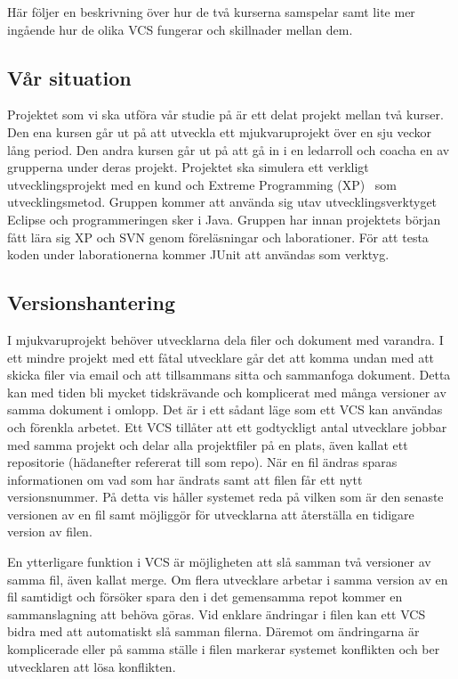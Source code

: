 Här följer en beskrivning över hur de två kurserna samspelar samt lite mer ingående hur de olika VCS fungerar och skillnader mellan dem.
\subsection{Vår situation}

Projektet som vi ska utföra vår studie på är ett delat projekt mellan två kurser. Den ena kursen går ut på att utveckla ett mjukvaruprojekt över en sju veckor lång period. Den andra kursen går ut på att gå in i en ledarroll och coacha en av grupperna under deras projekt. Projektet ska simulera ett verkligt utvecklingsprojekt med en kund och Extreme Programming (XP)~\cite{BeckXP} som utvecklingsmetod. Gruppen kommer att använda sig utav utvecklingsverktyget Eclipse och programmeringen sker i Java. Gruppen har innan projektets början fått lära sig XP och SVN genom föreläsningar och laborationer. För att testa koden under laborationerna kommer JUnit att användas som verktyg.


\subsection{Versionshantering}

I mjukvaruprojekt behöver utvecklarna dela filer och dokument med varandra. I ett mindre projekt med ett fåtal utvecklare går det att komma undan med att skicka filer via email och att tillsammans sitta och sammanfoga dokument. Detta kan med tiden bli mycket tidskrävande och komplicerat med många versioner av samma dokument i omlopp. Det är i ett sådant läge som ett VCS kan användas och förenkla arbetet. Ett VCS tillåter att ett godtyckligt antal utvecklare jobbar med samma projekt och delar alla projektfiler på en plats, även kallat ett repositorie (hädanefter refererat till som repo). När en fil ändras sparas informationen om vad som har ändrats samt att filen får ett nytt versionsnummer. På detta vis håller systemet reda på vilken som är den senaste versionen av en fil samt möjliggör för utvecklarna att återställa en tidigare version av filen.

En ytterligare funktion i VCS är möjligheten att slå samman två versioner av samma fil, även kallat merge. Om flera utvecklare arbetar i samma version av en fil samtidigt och försöker spara den i det gemensamma repot kommer en sammanslagning att behöva göras. Vid enklare ändringar i filen kan ett VCS bidra med att automatiskt slå samman filerna. Däremot om ändringarna är komplicerade eller på samma ställe i filen markerar systemet konflikten och ber utvecklaren att lösa konflikten.

